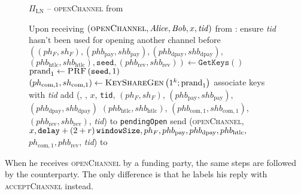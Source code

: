   \begin{figure}[H]
    \begin{protocolbox}{$\Pi_{\mathrm{LN}}$ -- \textsc{openChannel} from
    \environment}
      \begin{algorithmic}[1]
        \State Upon receiving $\left(\textsc{openChannel}, \mathit{Alice}, \mathit{Bob}, x,
        \mathit{tid}\right)$ from \environment:
        \Indent
          \State ensure \textit{tid} hasn't been used for opening another
          channel before
          \label{alg:protocol:open:env:valid}
          \State {}
          \State $\left(\left(ph_F, sh_F\right), \left(phb_{\mathrm{pay}},
          shb_{\mathrm{pay}}\right), \left(phb_{\mathrm{dpay}},
          shb_{\mathrm{dpay}}\right),\right.$ $\left.\left(phb_{\mathrm{htlc}},
          shb_{\mathrm{htlc}}\right), \mathtt{seed}, \left(phb_{\mathrm{rev}},
          shb_{\mathrm{rev}}\right)\right) \gets \texttt{GetKeys}\left(\right)$
          \State $\mathrm{prand}_1 \gets \textsc{PRF}\left(\mathtt{seed},
          1\right)$
          \label{alg:protocol:open:env:prf}
          \State $\left(ph_{\mathrm{com}, 1}, sh_{\mathrm{com}, 1}\right) \gets
          \textsc{KeyShareGen}\left(1^k; \mathrm{prand}_1\right)$
          \State associate keys with \textit{tid}
          \State add (\alice, \bob, $x$, \texttt{tid}, $(ph_F, sh_F)$,
          $(phb_{\mathrm{pay}}, shb_{\mathrm{pay}})$, $(phb_{\mathrm{dpay}},
          shb_{\mathrm{dpay}})$ $(phb_{\mathrm{htlc}}, shb_{\mathrm{htlc}})$,
          $(phb_{\mathrm{com}, 1}, shb_{\mathrm{com}, 1})$,
          $(phb_{\mathrm{rev}}, shb_{\mathrm{rev}})$, \textit{tid}) to
          \texttt{pendingOpen}
          \label{alg:protocol:open:env:pendingOpen}
          \State send (\textsc{openChannel}, $x, \mathtt{delay} + \left(2 + r\right)\texttt{windowSize},
          ph_F, phb_{\mathrm{pay}}, phb_{\mathrm{dpay}}, phb_{\mathrm{htlc}},$
          $ph_{\mathrm{com}, 1}, phb_{\mathrm{rev}}$, \textit{tid}) to \bob{}
        \EndIndent
      \end{algorithmic}
    \end{protocolbox}
    \caption{}
    \label{alg:protocol:open:env}
  \end{figure}

  When he receives \textsc{openChannel} by a funding party, the same steps are
  followed by the counterparty. The only difference is that he labels his reply
  with \textsc{acceptChannel} instead.

